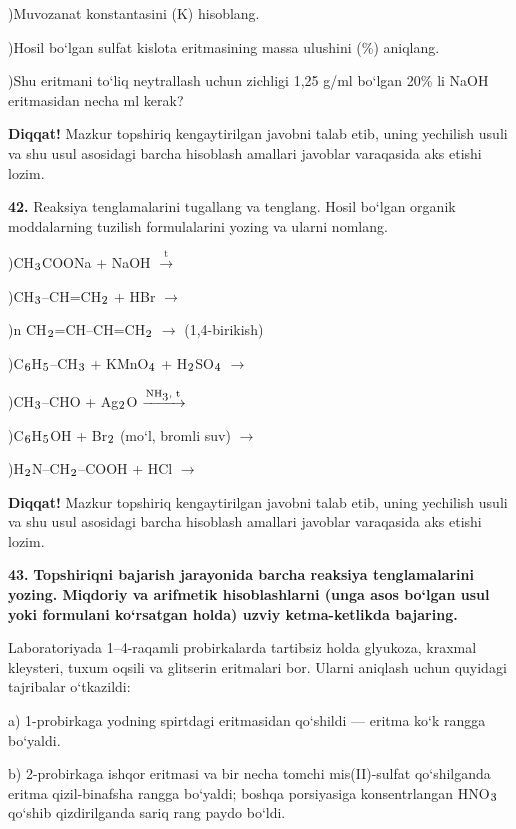 \documentclass[11pt,a4paper]{article}
\renewcommand{\textsubscript}[1]{\ensuremath{_{\text{\fontsize{8}{8}\selectfont #1}}}}
\newcommand{\diqqat}[1]{\par\smallskip\noindent\textbf{Diqqat!} #1\par\medskip}
\begin{document}
)Muvozanat konstantasini (K) hisoblang.\par
{})Hosil bo`lgan sulfat kislota eritmasining massa ulushini (\%) aniqlang.\par
{})Shu eritmani to`liq neytrallash uchun zichligi 1,25 g/ml bo`lgan 20\% li NaOH eritmasidan necha ml kerak?\par
\diqqat{Mazkur topshiriq kengaytirilgan javobni talab etib, uning yechilish usuli va shu usul asosidagi barcha hisoblash amallari javoblar varaqasida aks etishi lozim.}
\noindent\textbf{42.} Reaksiya tenglamalarini tugallang va tenglang. Hosil bo`lgan organik moddalarning tuzilish formulalarini yozing va ularni nomlang.\par
{})CH\textsubscript{3}COONa + NaOH $\xrightarrow{\text{t}}$\par
{})CH\textsubscript{3}--CH=CH\textsubscript{2} + HBr $\to$\par
{})n CH\textsubscript{2}=CH--CH=CH\textsubscript{2} $\to$ (1,4-birikish)\par
{})C\textsubscript{6}H\textsubscript{5}--CH\textsubscript{3} + KMnO\textsubscript{4} + H\textsubscript{2}SO\textsubscript{4} $\to$\par
{})CH\textsubscript{3}--CHO + Ag\textsubscript{2}O $\xrightarrow{\text{NH\textsubscript{3}, t}}$\par
{})C\textsubscript{6}H\textsubscript{5}OH + Br\textsubscript{2} (mo`l, bromli suv) $\to$\par
{})H\textsubscript{2}N--CH\textsubscript{2}--COOH + HCl $\to$\par
\diqqat{Mazkur topshiriq kengaytirilgan javobni talab etib, uning yechilish usuli va shu usul asosidagi barcha hisoblash amallari javoblar varaqasida aks etishi lozim.}
\noindent\textbf{43.} \textbf{Topshiriqni bajarish jarayonida barcha reaksiya tenglamalarini yozing. Miqdoriy va arifmetik hisoblashlarni (unga asos bo`lgan usul yoki formulani ko`rsatgan holda) uzviy ketma-ketlikda bajaring.}\par\smallskip
Laboratoriyada 1--4-raqamli probirkalarda tartibsiz holda glyukoza, kraxmal kleysteri, tuxum oqsili va glitserin eritmalari bor. Ularni aniqlash uchun quyidagi tajribalar o`tkazildi:\par
a) 1-probirkaga yodning spirtdagi eritmasidan qo`shildi --- eritma ko`k rangga bo`yaldi.\par
b) 2-probirkaga ishqor eritmasi va bir necha tomchi mis(II)-sulfat qo`shilganda eritma qizil-binafsha rangga bo`yaldi; boshqa porsiyasiga konsentrlangan HNO\textsubscript{3} qo`shib qizdirilganda sariq rang paydo bo`ldi.\par
\end{document}
